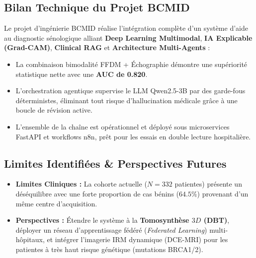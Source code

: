 \documentclass[11pt,a4paper]{article}
\begin{document}
\subsection{Bilan Technique du Projet BCMID}
Le projet d'ing\'enierie BCMID r\'ealise l'int\'egration compl\`ete d'un syst\`eme d'aide au diagnostic s\'enologique alliant \textbf{Deep Learning Multimodal}, \textbf{IA Explicable (Grad-CAM)}, \textbf{Clinical RAG} et \textbf{Architecture Multi-Agents} :
\begin{itemize}
    \item La combinaison bimodalit\'e FFDM + \'Echographie d\'emontre une sup\'eriorit\'e statistique nette avec une \textbf{AUC de 0.820}.
    \item L'orchestration agentique supervise le LLM Qwen2.5-3B par des garde-fous d\'eterministes, \'eliminant tout risque d'hallucination m\'edicale gr\^ace \`a une boucle de r\'evision active.
    \item L'ensemble de la cha\^ine est op\'erationnel et d\'eploy\'e sous microservices FastAPI et workflows n8n, pr\^et pour les essais en double lecture hospitali\`ere.
\end{itemize}

\subsection{Limites Identifiées \& Perspectives Futures}
\begin{itemize}
    \item \textbf{Limites Cliniques :} La cohorte actuelle ($N=332$ patientes) pr\'esente un d\'es\'equilibre avec une forte proportion de cas b\'enins ($64.5\%$) provenant d'un m\^eme centre d'acquisition.
    \item \textbf{Perspectives :} \'Etendre le syst\`eme \`a la \textbf{Tomosynth\`ese $3D$ (DBT)}, d\'eployer un r\'eseau d'apprentissage f\'ed\'er\'e (\textit{Federated Learning}) multi-h\^opitaux, et int\'egrer l'imagerie IRM dynamique (DCE-MRI) pour les patientes \`a tr\`es haut risque g\'en\'etique (mutations BRCA1/2).
\end{itemize}
\end{document}
